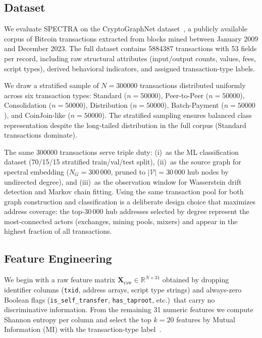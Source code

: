 \documentclass[journal]{IEEEtran}
\begin{document}
\subsection{Dataset}
\label{subsec:dataset}

We evaluate SPECTRA on the CryptoGraphNet dataset~\cite{cryptographnet2024},
a publicly available corpus of Bitcoin transactions extracted from blocks
mined between January 2009 and December 2023.
The full dataset contains \num{5884387} transactions with \num{53} fields per
record, including raw structural attributes (input/output counts, values, fees,
script types), derived behavioral indicators, and assigned transaction-type labels.

We draw a stratified sample of $N = \num{300000}$ transactions distributed
uniformly across six transaction types:
Standard ($n = \num{50000}$),
Peer-to-Peer ($n = \num{50000}$),
Consolidation ($n = \num{50000}$),
Distribution ($n = \num{50000}$),
Batch-Payment ($n = \num{50000}$), and
CoinJoin-like ($n = \num{50000}$).
The stratified sampling ensures balanced class representation despite the
long-tailed distribution in the full corpus (Standard transactions dominate).

The same \num{300000} transactions serve triple duty:
(i)~as the ML classification dataset (70/15/15 stratified train/val/test split),
(ii)~as the source graph for spectral embedding ($N_G = 300\,000$,
pruned to $|\mathcal{V}| = 30\,000$ hub nodes by undirected degree), and
(iii)~as the observation window for Wasserstein drift detection and
Markov chain fitting.
Using the same transaction pool for both graph construction and classification
is a deliberate design choice that maximizes address coverage: the top-30\,000
hub addresses selected by degree represent the most-connected actors
(exchanges, mining pools, mixers) and appear in the highest fraction of
all transactions.


\subsection{Feature Engineering}
\label{subsec:features}

We begin with a raw feature matrix $\mathbf{X}_{\text{raw}} \in \mathbb{R}^{N \times 31}$
obtained by dropping identifier columns (\texttt{txid}, address arrays,
script type strings) and always-zero Boolean flags
(\texttt{is\_self\_transfer}, \texttt{has\_taproot}, etc.)\ that carry no
discriminative information.
From the remaining 31 numeric features we compute Shannon entropy per column
and select the top $k = 20$ features by Mutual Information (MI) with the
transaction-type label~\cite{Kraskov2004}.
\end{document}
